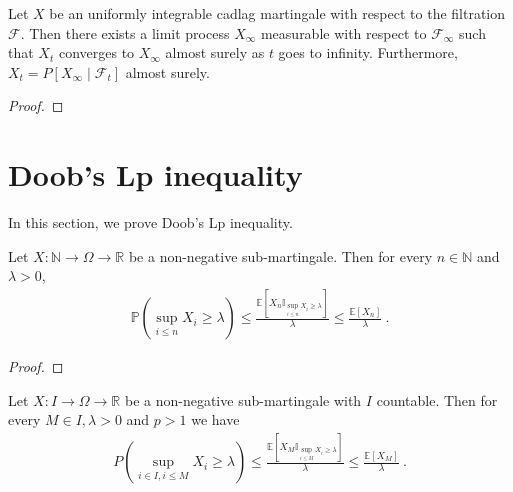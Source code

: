 \begin{theorem}\label{thm:tendsto_limitProcess_of_cadlag}
  \notready
Let $X$ be an uniformly integrable cadlag martingale with respect to the filtration $\mathcal{F}$.
Then there exists a limit process $X_\infty$ measurable with respect to $\mathcal{F}_\infty$ such that $X_t$ converges to $X_\infty$ almost surely as $t$ goes to infinity.
Furthermore, $X_t = P[X_\infty \mid \mathcal{F}_t]$ almost surely.
\end{theorem}

\begin{proof}

\end{proof}





\section{Doob's Lp inequality}

In this section, we prove Doob's Lp inequality.


\begin{lemma}\label{lem:maximal_ineq}
  \mathlibok
Let $X : \mathbb{N} \rightarrow \Omega \rightarrow \mathbb{R}$ be a non-negative sub-martingale.
Then for every $n \in \mathbb{N}$ and $\lambda > 0$,
\begin{align*}
  \mathbb{P}\left(\sup_{i \le n}X_i\geq\lambda \right)
  \le \frac{\mathbb{E}\left[X_n \mathbb{I}_{\sup_{i \le n}X_i \ge \lambda}\right]}{\lambda}
  \le \frac{\mathbb{E}[X_n]}{\lambda}
  \: .
\end{align*}
\end{lemma}

\begin{proof}\leanok

\end{proof}


\begin{lemma}\label{lem:doob_countable}
  \leanok
  Let $X : I \rightarrow \Omega \rightarrow \mathbb{R}$ be a non-negative sub-martingale with $I$ countable.
  Then for every $M \in I,\lambda > 0$ and $p>1$ we have
  \begin{align*}
    P\left( \sup_{i\in I, i\leq M}X_i\geq\lambda \right)
    \le \frac{\mathbb{E}\left[X_M \mathbb{I}_{\sup_{i \le M}X_i \ge \lambda}\right]}{\lambda}
    \le \frac{\mathbb{E}[X_M]}{\lambda}
    \: .
  \end{align*}
\end{lemma}

